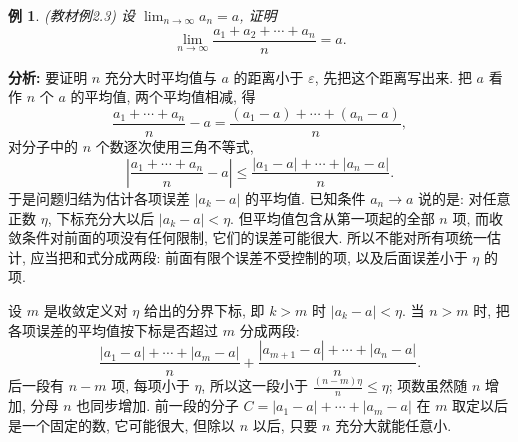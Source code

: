 \documentclass[UTF8,openany]{ctexbook}
\theoremstyle{chinesetextbook}
\newtheorem{example}{例}[section]
\begin{document}
\begin{example}\label{ex:2-3}
\textnormal{(教材例2.3)} 设 $\displaystyle\lim_{n\to\infty}a_n=a$, 证明
\[
\lim_{n\to\infty}\frac{a_1+a_2+\cdots+a_n}n=a.
\]
\end{example}
\par\indent\textbf{分析:} 要证明 $n$ 充分大时平均值与 $a$ 的距离小于 $\varepsilon$, 先把这个距离写出来. 把 $a$ 看作 $n$ 个 $a$ 的平均值, 两个平均值相减, 得
\[
\frac{a_1+\cdots+a_n}n-a=\frac{(a_1-a)+\cdots+(a_n-a)}n,
\]
对分子中的 $n$ 个数逐次使用三角不等式,
\[
\left|\frac{a_1+\cdots+a_n}n-a\right|\le\frac{|a_1-a|+\cdots+|a_n-a|}n.
\]
于是问题归结为估计各项误差 $|a_k-a|$ 的平均值. 已知条件 $a_n\to a$ 说的是: 对任意正数 $\eta$, 下标充分大以后 $|a_k-a|<\eta$. 但平均值包含从第一项起的全部 $n$ 项, 而收敛条件对前面的项没有任何限制, 它们的误差可能很大. 所以不能对所有项统一估计, 应当把和式分成两段: 前面有限个误差不受控制的项, 以及后面误差小于 $\eta$ 的项.

设 $m$ 是收敛定义对 $\eta$ 给出的分界下标, 即 $k>m$ 时 $|a_k-a|<\eta$. 当 $n>m$ 时, 把各项误差的平均值按下标是否超过 $m$ 分成两段:
\[
\frac{|a_1-a|+\cdots+|a_m-a|}n+\frac{|a_{m+1}-a|+\cdots+|a_n-a|}n.
\]
后一段有 $n-m$ 项, 每项小于 $\eta$, 所以这一段小于 $\displaystyle\frac{(n-m)\eta}n\le\eta$; 项数虽然随 $n$ 增加, 分母 $n$ 也同步增加. 前一段的分子 $C=|a_1-a|+\cdots+|a_m-a|$ 在 $m$ 取定以后是一个固定的数, 它可能很大, 但除以 $n$ 以后, 只要 $n$ 充分大就能任意小.
\end{document}

